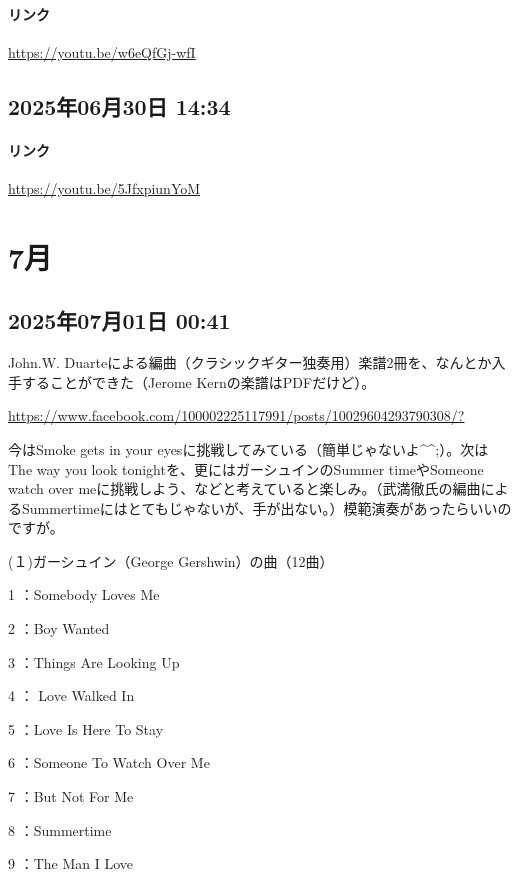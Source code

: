 \paragraph{リンク}
\url{https://youtu.be/w6eQfGj-wfI}

\subsection*{2025年06月30日 14:34}

\paragraph{リンク}
\url{https://youtu.be/5JfxpiunYoM}

\section{7月}

\subsection*{2025年07月01日 00:41}

John.W. Duarteによる編曲（クラシックギター独奏用）楽譜2冊を、なんとか入手することができた（Jerome Kernの楽譜はPDFだけど）。

\url{https://www.facebook.com/100002225117991/posts/10029604293790308/?}

今はSmoke gets in your eyesに挑戦してみている（簡単じゃないよ\textasciicircum{}\textasciicircum{};）。次はThe way you look tonightを、更にはガーシュインのSummer timeやSomeone watch over meに挑戦しよう、などと考えていると楽しみ。（武満徹氏の編曲によるSummertimeにはとてもじゃないが、手が出ない。）模範演奏があったらいいのですが。

(１)ガーシュイン（George Gershwin）の曲（12曲）

1 ：Somebody Loves Me

2 ：Boy Wanted

3 ：Things Are Looking Up

4 ： Love Walked In

5 ：Love Is Here To Stay

6 ：Someone To Watch Over Me

7 ：But Not For Me

8 ：Summertime

9 ：The Man I Love

